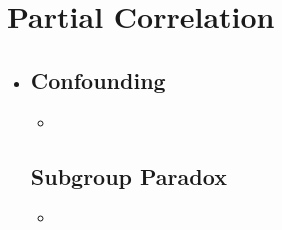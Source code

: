 \section{Partial Correlation}
\begin{itemize}
  \item[]

  \subsection{Confounding}
  \begin{itemize}
    \item 
  \end{itemize}

  \subsection{Subgroup Paradox}
  \begin{itemize}
    \item 
  \end{itemize}
  
\end{itemize}
